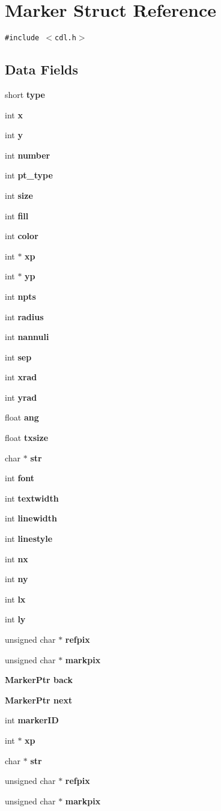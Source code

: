 \section{Marker Struct Reference}
\label{structMarker}
{\tt \#include $<$cdl.h$>$}

\subsection*{Data Fields}
\begin{CompactItemize}
\item 
short \bf{type}
\item 
int \bf{x}
\item 
int \bf{y}
\item 
int \bf{number}
\item 
int \bf{pt\_\-type}
\item 
int \bf{size}
\item 
int \bf{fill}
\item 
int \bf{color}
\item 
int $\ast$ \bf{xp}
\item 
int $\ast$ \bf{yp}
\item 
int \bf{npts}
\item 
int \bf{radius}
\item 
int \bf{nannuli}
\item 
int \bf{sep}
\item 
int \bf{xrad}
\item 
int \bf{yrad}
\item 
float \bf{ang}
\item 
float \bf{txsize}
\item 
char $\ast$ \bf{str}
\item 
int \bf{font}
\item 
int \bf{textwidth}
\item 
int \bf{linewidth}
\item 
int \bf{linestyle}
\item 
int \bf{nx}
\item 
int \bf{ny}
\item 
int \bf{lx}
\item 
int \bf{ly}
\item 
unsigned char $\ast$ \bf{refpix}
\item 
unsigned char $\ast$ \bf{markpix}
\item 
\bf{Marker\-Ptr} \bf{back}
\item 
\bf{Marker\-Ptr} \bf{next}
\item 
int \bf{marker\-ID}
\item 
int $\ast$ \bf{xp}
\item 
char $\ast$ \bf{str}
\item 
unsigned char $\ast$ \bf{refpix}
\item 
unsigned char $\ast$ \bf{markpix}
\end{CompactItemize}


